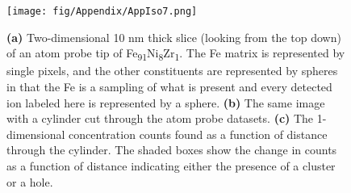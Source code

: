 \begin{figure}
	\centering
	\texttt{[image: fig/Appendix/AppIso7.png]}
	\caption[Two-dimensional 10 nm thick slice (looking from the top down) of an atom probe tip of Fe\textsubscript{91}Ni\textsubscript{8}Zr\textsubscript{1}.]{\textbf{(a)} Two-dimensional 10 nm thick slice (looking from the top down) of an atom probe tip of Fe\textsubscript{91}Ni\textsubscript{8}Zr\textsubscript{1}. The Fe matrix is represented by single pixels, and the other constituents are represented by spheres in that the Fe is a sampling of what is present and every detected ion labeled here is represented by a sphere. \textbf{(b)} The same image with a cylinder cut through the atom probe datasets. \textbf{(c)} The 1-dimensional concentration counts found as a function of distance through the cylinder. The shaded boxes show the change in counts as a function of distance indicating either the presence of a cluster or a hole.}
	\label{fig:AppIso7}
\end{figure}
